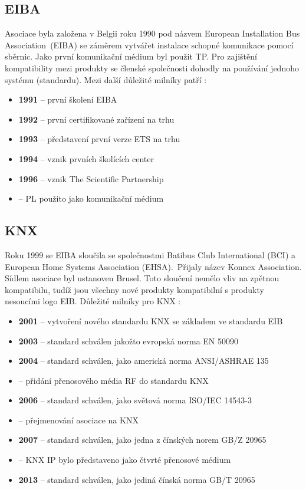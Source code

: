 \subsection{EIBA}
Asociace byla založena v Belgii roku 1990 pod názvem European Installation Bus Association~(EIBA) se záměrem vytvářet instalace schopné komunikace pomocí sběrnic. Jako první komunikační médium byl použit TP. Pro zajištění kompatibility mezi produkty se členské společnosti dohodly na používání jednoho systému (standardu). Mezi další důležité milníky patří \cite{KNX history}:
\begin{itemize}
\item \textbf{1991} -- první školení EIBA
\item \textbf{1992} -- první certifikované zařízení na trhu
\item \textbf{1993} -- představení první verze ETS na trhu 
\item \textbf{1994} -- vznik prvních školících center
\item \textbf{1996} -- vznik The Scientific Partnership
\item[] \hspace{0.95cm} -- PL použito jako komunikační médium
\end{itemize}

\subsection{KNX}
Roku 1999 se EIBA sloučila se společnostmi Batibus Club International (BCI) a European Home Systems Association (EHSA).~Přijaly název Konnex Association. Sídlem asociace byl ustanoven Brusel. Toto sloučení nemělo vliv na zpětnou kompatibilu, tudíž jsou všechny nové produkty kompatibilní s produkty nesoucími logo EIB. Důležité milníky pro KNX \cite{KNX  history}:
\begin{itemize}
\item \textbf{2001} -- vytvoření nového standardu KNX se základem ve standardu EIB
\item \textbf{2003} -- standard schválen jakožto evropská norma EN 50090
\item \textbf{2004} -- standard schválen, jako americká norma  ANSI/ASHRAE 135
\item[] \hspace{0.95cm} -- přidání přenosového média RF do standardu KNX
\item \textbf{2006} -- standard schválen, jako světová norma  ISO/IEC 14543-3
\item[] \hspace{0.95cm} -- přejmenování asociace na KNX
\item \textbf{2007} -- standard schválen, jako jedna z čínských norem GB/Z 20965
\item[] \hspace{0.95cm} -- KNX IP bylo představeno jako čtvrté přenosové médium
\item \textbf{2013} -- standard schválen, jako jediná čínská norma GB/T 20965
\end{itemize}

